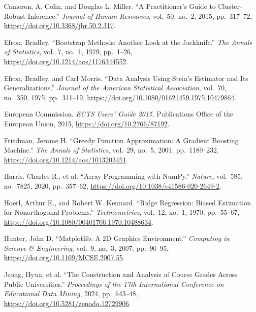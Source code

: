 \begin{list}{}{\setlength{\leftmargin}{1.5em}\setlength{\itemindent}{-1.5em}\setlength{\itemsep}{0.25em}\setlength{\parsep}{0pt}}
\item Cameron, A. Colin, and Douglas L. Miller. ``A Practitioner's Guide to Cluster-Robust Inference.'' \textit{Journal of Human Resources}, vol.~50, no.~2, 2015, pp.~317--72, \url{https://doi.org/10.3368/jhr.50.2.317}.
\item Efron, Bradley. ``Bootstrap Methods: Another Look at the Jackknife.'' \textit{The Annals of Statistics}, vol.~7, no.~1, 1979, pp.~1--26, \url{https://doi.org/10.1214/aos/1176344552}.
\item Efron, Bradley, and Carl Morris. ``Data Analysis Using Stein's Estimator and Its Generalizations.'' \textit{Journal of the American Statistical Association}, vol.~70, no.~350, 1975, pp.~311--19, \url{https://doi.org/10.1080/01621459.1975.10479864}.
\item European Commission. \textit{ECTS Users' Guide 2015}. Publications Office of the European Union, 2015, \url{https://doi.org/10.2766/87192}.
\item Friedman, Jerome H. ``Greedy Function Approximation: A Gradient Boosting Machine.'' \textit{The Annals of Statistics}, vol.~29, no.~5, 2001, pp.~1189--232, \url{https://doi.org/10.1214/aos/1013203451}.
\item Harris, Charles R., et al. ``Array Programming with NumPy.'' \textit{Nature}, vol.~585, no.~7825, 2020, pp.~357--62, \url{https://doi.org/10.1038/s41586-020-2649-2}.
\item Hoerl, Arthur E., and Robert W. Kennard. ``Ridge Regression: Biased Estimation for Nonorthogonal Problems.'' \textit{Technometrics}, vol.~12, no.~1, 1970, pp.~55--67, \url{https://doi.org/10.1080/00401706.1970.10488634}.
\item Hunter, John D. ``Matplotlib: A 2D Graphics Environment.'' \textit{Computing in Science \& Engineering}, vol.~9, no.~3, 2007, pp.~90--95, \url{https://doi.org/10.1109/MCSE.2007.55}.
\item Jeong, Hyun, et al. ``The Construction and Analysis of Course Grades Across Public Universities.'' \textit{Proceedings of the 17th International Conference on Educational Data Mining}, 2024, pp.~643--48, \url{https://doi.org/10.5281/zenodo.12729906}.

\end{list}
